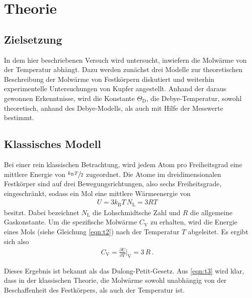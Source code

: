 \section{Theorie}
\label{sec:Theorie}

\subsection*{Zielsetzung}
\label{subsec:zielsetzung}
In dem hier beschriebenen Versuch wird untersucht,
inwiefern die Molwärme von der Temperatur abhängt.
Dazu werden zunächst drei Modelle zur theoretischen Beschreibung
der Molwärme von Festkörpern diskutiert und weiterhin experimentelle
Untersuchungen von Kupfer angestellt.
Anhand der daraus gewonnen Erkenntnisse, wird die Konstante $\Theta_{\text{D}}$,
die Debye-Temperatur, sowohl theoretisch, anhand des Debye-Modells,
als auch mit Hilfe der Messwerte bestimmt.

\subsection{Klassisches Modell}
\label{subsec:klassisch}
Bei einer rein klassischen Betrachtung, wird jedem Atom pro Freiheitsgrad eine mittlere
Energie von $\sfrac{k_{\text{B}} T}{2}$ zugeordnet. Die Atome im dreidimensionalen
Festkörper sind auf drei Bewegungsrichtungen, also sechs Freiheitsgrade, eingeschränkt, sodass
ein Mol eine mittlere Wärmeenergie von
\begin{align}
	U = 3 k_{\text{B}} T \, N_{\text{L}} = 3 R T\label{eqn:t2}
\end{align}
besitzt. Dabei bezeichnet $N_{\text{L}}$ die
Lohschmidtsche Zahl und
$R$ die allgemeine Gaskonstante.
Um die spezifische Molwärme $C_{\text{V}}$ zu erhalten,
wird die Energie eines Mols (siehe Gleichung \eqref{eqn:t2})
nach der Temperatur $T$ abgeleitet.
Es ergibt sich also
\begin{align}
	C_{\text{V}} = \frac{\partial U}{\partial T}
	\bigg\vert_{\text{V}} = 3 \, R \, . \label{eqn:t3}
\end{align}

Dieses Ergebnis ist bekannt als das Dulong-Petit-Gesetz.
Aus \eqref{eqn:t3} wird klar, dass in der klassischen Theorie,
die Molwärme sowohl unabhängig von der Beschaffenheit des
Festkörpers, als auch der Temperatur ist.


